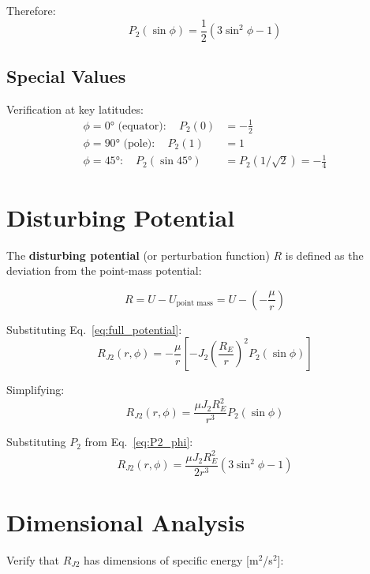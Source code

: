 \documentclass[11pt]{article}
\begin{document}
Therefore:
\begin{equation}
P_2(\sin \phi) = \frac{1}{2}(3\sin^2 \phi - 1)
\label{eq:P2_phi}
\end{equation}

\subsection{Special Values}

Verification at key latitudes:
\begin{align}
\phi = 0° \text{ (equator)}: \quad P_2(0) &= -\frac{1}{2}\\
\phi = 90° \text{ (pole)}: \quad P_2(1) &= 1\\
\phi = 45°: \quad P_2(\sin 45°) &= P_2(1/\sqrt{2}) = -\frac{1}{4}
\end{align}

\section{Disturbing Potential}

The \textbf{disturbing potential} (or perturbation function) $R$ is defined as the deviation from the point-mass potential:

\begin{equation}
R = U - U_{\text{point mass}} = U - \left(-\frac{\mu}{r}\right)
\end{equation}

Substituting Eq.~\eqref{eq:full_potential}:
\begin{equation}
R_{J2}(r, \phi) = -\frac{\mu}{r}\left[- J_2\left(\frac{R_E}{r}\right)^2 P_2(\sin \phi)\right]
\end{equation}

Simplifying:
\begin{equation}
\boxed{R_{J2}(r, \phi) = \frac{\mu J_2 R_E^2}{r^3} P_2(\sin \phi)}
\label{eq:disturbing_potential}
\end{equation}

Substituting $P_2$ from Eq.~\eqref{eq:P2_phi}:
\begin{equation}
R_{J2}(r, \phi) = \frac{\mu J_2 R_E^2}{2r^3}\left(3\sin^2 \phi - 1\right)
\label{eq:disturbing_expanded}
\end{equation}

\section{Dimensional Analysis}

Verify that $R_{J2}$ has dimensions of specific energy [m$^2$/s$^2$]:
\end{document}
